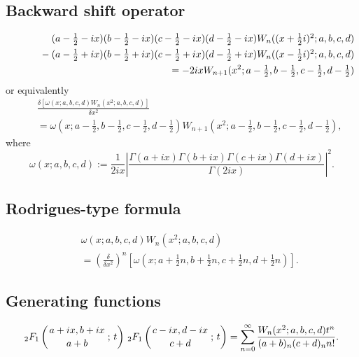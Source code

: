 \documentclass[envcountchap,graybox]{svmono}
\newcommand{\hyp}[5]{\mbox{}_{#1}{F}_{#2}
\left(\genfrac{}{}{0pt}{}{#3}{#4}\,;\,#5\right)}
\newcommand{\mathindent}{\hspace{7.5mm}}
\renewcommand{\Gamma}{\varGamma}
\newcommand{\hyp}[5]{\,\mbox{}_{#1}F_{#2}\!\left(
  \genfrac{}{}{0pt}{}{#3}{#4};#5\right)}
\begin{document}
\newpage

\subsection*{Backward shift operator}
\begin{eqnarray}
\label{shift2WilsonI}
& &(a-\textstyle\frac{1}{2}-ix)(b-\textstyle\frac{1}{2}-ix)
(c-\textstyle\frac{1}{2}-ix)(d-\textstyle\frac{1}{2}-ix)
W_n((x+\textstyle\frac{1}{2}i)^2;a,b,c,d)\nonumber\\
& &{}\mathindent{}-(a-\textstyle\frac{1}{2}+ix)(b-\textstyle\frac{1}{2}+ix)
(c-\textstyle\frac{1}{2}+ix)(d-\textstyle\frac{1}{2}+ix)
W_n((x-\textstyle\frac{1}{2}i)^2;a,b,c,d)\nonumber\\
& &{}=-2ix W_{n+1}(x^2;a-\textstyle\frac{1}{2},b-\textstyle\frac{1}{2},
c-\textstyle\frac{1}{2},d-\textstyle\frac{1}{2})
\end{eqnarray}
or equivalently
\begin{eqnarray}
\label{shift2WilsonII}
& &\frac{\delta\left[\omega(x;a,b,c,d)W_n(x^2;a,b,c,d)\right]}{\delta x^2}\nonumber\\
& &{}=\omega(x;a-\textstyle\frac{1}{2},b-\textstyle\frac{1}{2},
c-\textstyle\frac{1}{2},d-\textstyle\frac{1}{2})
W_{n+1}(x^2;a-\textstyle\frac{1}{2},b-\textstyle\frac{1}{2},c-\textstyle\frac{1}{2},d-\textstyle\frac{1}{2}),
\end{eqnarray}
where
$$\omega(x;a,b,c,d):=\frac{1}{2ix}\left|\frac{\Gamma(a+ix)\Gamma(b+ix)\Gamma(c+ix)\Gamma(d+ix)}{\Gamma(2ix)}\right|^2.$$

\subsection*{Rodrigues-type formula}
\begin{eqnarray}
\label{RodWilson}
& &\omega(x;a,b,c,d)W_n(x^2;a,b,c,d)\nonumber\\
& &{}=\left(\frac{\delta}{\delta x^2}\right)^n
\left[\omega(x;a+\textstyle\frac{1}{2}n,b+\textstyle\frac{1}{2}n,
c+\textstyle\frac{1}{2}n,d+\textstyle\frac{1}{2}n)\right].
\end{eqnarray}

\subsection*{Generating functions}
\begin{equation}
\label{GenWilson1}
\hyp{2}{1}{a+ix,b+ix}{a+b}{t}\,\hyp{2}{1}{c-ix,d-ix}{c+d}{t}=
\sum_{n=0}^{\infty}\frac{W_n(x^2;a,b,c,d)t^n}{(a+b)_n(c+d)_nn!}.
\end{equation}
\end{document}
